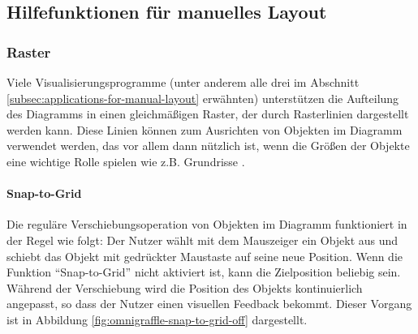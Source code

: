 \subsection{Hilfefunktionen für manuelles Layout}
\label{subsec:help-functions-for-manual-layout}

\subsubsection{Raster}
\label{subsubsec:grid}

Viele Visualisierungsprogramme (unter anderem alle drei im Abschnitt \ref{subsec:applications-for-manual-layout} erwähnten) unterstützen die Aufteilung des Diagramms in einen gleichmäßigen Raster, der durch Rasterlinien dargestellt werden kann. Diese Linien können zum Ausrichten von Objekten im Diagramm verwendet werden, das vor allem dann nützlich ist, wenn die Größen der Objekte eine wichtige Rolle spielen wie z.B. Grundrisse \cite{08OmniGraffle, Olsen10OmniGraffle, 11Keynote, 14Visual}.

\paragraph{Snap-to-Grid}

Die reguläre Verschiebungsoperation von Objekten im Diagramm funktioniert in der Regel wie folgt: Der Nutzer wählt mit dem Mauszeiger ein Objekt aus und schiebt das Objekt mit gedrückter Maustaste auf seine neue Position. Wenn die Funktion \enquote{Snap-to-Grid} nicht aktiviert ist, kann die Zielposition beliebig sein. Während der Verschiebung wird die Position des Objekts kontinuierlich angepasst, so dass der Nutzer einen visuellen Feedback bekommt. Dieser Vorgang ist in Abbildung \ref{fig:omnigraffle-snap-to-grid-off} dargestellt.

